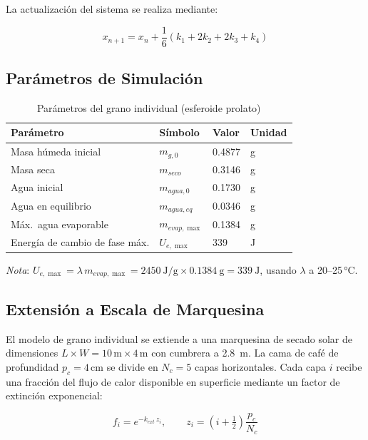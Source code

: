 \documentclass[conference]{IEEEtran}
\begin{document}
La actualización del sistema se realiza mediante:

\begin{equation}
x_{n+1}
=
x_n
+
\frac{1}{6}
(k_1+2k_2+2k_3+k_4)
\end{equation}

\subsection{Parámetros de Simulación}

\begin{table}[H]
\centering
\caption{Parámetros del grano individual (esferoide prolato)}
\begin{tabular}{llll}
\toprule
Parámetro & Símbolo & Valor & Unidad \\
\midrule
Masa húmeda inicial & $m_{g,0}$ & 0.4877 & g \\
Masa seca & $m_{seco}$ & 0.3146 & g \\
Agua inicial & $m_{agua,0}$ & 0.1730 & g \\
Agua en equilibrio & $m_{agua,eq}$ & 0.0346 & g \\
Máx.\ agua evaporable & $m_{evap,\max}$ & 0.1384 & g \\
Energía de cambio de fase máx. & $U_{e,\max}$ & 339 & J \\
\bottomrule
\end{tabular}
\par\smallskip
{\footnotesize \textit{Nota}: $U_{e,\max} = \lambda\,m_{evap,\max} = \qty{2450}{\joule\per\gram}\times\qty{0.1384}{\gram} = \qty{339}{\joule}$, usando $\lambda$ a 20--25\,°C.}
\end{table}

\subsection{Extensión a Escala de Marquesina}

El modelo de grano individual se extiende a una marquesina de secado solar de dimensiones $L \times W = 10\,\text{m} \times 4\,\text{m}$ con cumbrera a 2.8~m. La cama de café de profundidad $p_c = 4\,\text{cm}$ se divide en $N_c = 5$ capas horizontales. Cada capa $i$ recibe una fracción del flujo de calor disponible en superficie mediante un factor de extinción exponencial:

\begin{equation}
f_i = e^{-k_{ext}\, z_i},
\qquad z_i = \left(i + \tfrac{1}{2}\right)\frac{p_c}{N_c}
\label{eq:factor_capa}
\end{equation}
\end{document}
